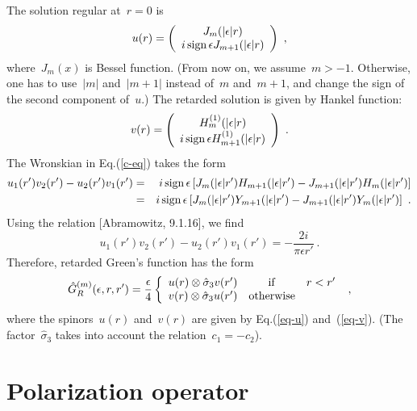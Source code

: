 \documentclass[preprint,aps,prb]{revtex4}
\begin{document}
The solution regular at~$r = 0$ is
\begin{equation}
\label{eq-u}
u (r) = \left(
\begin{array}{cc}
J_{m} (|\epsilon| r) \\
i \mathop{\rm sign}\nolimits\epsilon J_{m + 1}(|\epsilon| r)
\end{array}
\right)
\ , 
\end{equation}
where~$J_{m}(x)$ is Bessel function. (From now on, we assume~$m > -1$. 
Otherwise, one has to use~$|m|$ and~$|m + 1|$ instead of~$m$ and~$m +
1$, and change the sign of the second component of~$u$.)
The retarded solution is 
given by Hankel function:
\begin{equation}
\label{eq-v}
v(r) = \left(
\begin{array}{c}
H_{m}^{(1)}(|\epsilon|r) \\
i \mathop{\rm sign}\nolimits\epsilon H_{m + 1}^{(1)}(|\epsilon|r)
\end{array}
\right)
\ .
\end{equation}
The Wronskian in Eq.(\ref{c-eq}) takes the form
\begin{eqnarray}
u_1(r') v_2(r') - u_2(r') v_1(r') &=& i  \mathop{\rm
sign}\nolimits\epsilon \left[
J_m(|\epsilon|r') H_{m + 1}(|\epsilon|r') 
- J_{m + 1}(|\epsilon|r') H_m(|\epsilon|r')
\right] 
\\
\nonumber
&=&  i  \mathop{\rm sign}\nolimits\epsilon 
\left[ J_{m} (|\epsilon|r') Y_{m + 1}(|\epsilon|r') 
- J_{m + 1} (|\epsilon|r') Y_{m}(|\epsilon|r')
\right] \ .
\end{eqnarray}
Using  the relation [Abramowitz, 9.1.16], we find
\begin{equation}
u_1(r') v_2(r') - u_2(r') v_1(r')
= - \frac{2 i}{\pi \epsilon r'}
\ .
\end{equation}
Therefore, retarded Green's function has the form
\begin{equation}
\hat{G}^{(m)}_R(\epsilon, r, r') = \frac{\epsilon}{4} 
\left\{
\begin{array}{ccc}
u(r) \otimes \hat{\sigma}_3 v(r') & {\rm if} & r < r' \\
v(r) \otimes \hat{\sigma}_3 u(r') & {\rm otherwise} &  
\end{array}
\right.
\ , 
\end{equation}
where the spinors~$u(r)$ and~$v(r)$ are given by Eq.(\ref{eq-u}) 
and~(\ref{eq-v}).
(The factor~$\hat{\sigma}_3$ takes into account the relation~$c_1 = -c_2$).

\section{Polarization operator}
\end{document}
